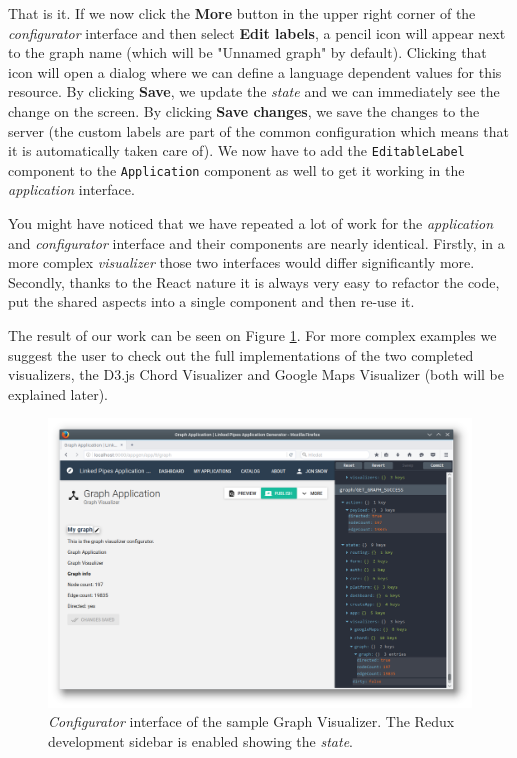 That is it. If we now click the \textbf{More} button in the upper right corner of the \emph{configurator} interface and then select \textbf{Edit labels}, a pencil icon will appear next to the graph name (which will be "Unnamed graph" by default). Clicking that icon will open a dialog where we can define a language dependent values for this resource. By clicking \textbf{Save}, we update the \emph{state} and we can immediately see the change on the screen. By clicking \textbf{Save changes}, we save the changes to the server (the custom labels are part of the common configuration which means that it is automatically taken care of). We now have to add the \texttt{EditableLabel} component to the \texttt{Application} component as well to get it working in the \emph{application} interface.

You might have noticed that we have repeated a lot of work for the \emph{application} and \emph{configurator} interface and their components are nearly identical. Firstly, in a more complex \emph{visualizer} those two interfaces would differ significantly more. Secondly, thanks to the React nature it is always very easy to refactor the code, put the shared aspects into a single component and then re-use it.

The result of our work can be seen on Figure \ref{fig:graph-visualizer}. For more complex examples we suggest the user to check out the full implementations of the two completed visualizers, the D3.js Chord Visualizer and Google Maps Visualizer (both will be explained later).

\begin{figure}
	\centering
	\includegraphics[width=145mm]{img/05_graph_visualizer}
	\caption{\emph{Configurator} interface of the sample Graph Visualizer. The Redux development sidebar is enabled showing the \emph{state}.}
    \label{fig:graph-visualizer}
\end{figure}

